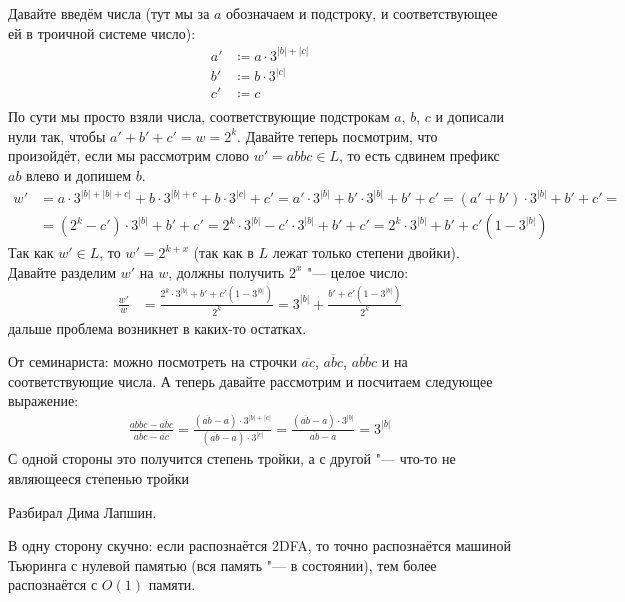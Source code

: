 	Давайте введём числа (тут мы за $a$ обозначаем и подстроку, и соответствующее ей
	в троичной системе число):
	\begin{align*}
		a' &\coloneq a \cdot 3^{|b|+|c|} \\
		b' &\coloneq b \cdot 3^{|c|} \\
		c' &\coloneq c \\
	\end{align*}
	По сути мы просто взяли числа, соответствующие подстрокам $a$, $b$, $c$ и дописали нули так, чтобы
	$a'+b'+c'=w=2^k$.
	Давайте теперь посмотрим, что произойдёт, если мы рассмотрим слово $w'=abbc\in L$,
	то есть сдвинем префикс $ab$ влево и допишем $b$.
	\begin{align*}
		w' &= a\cdot3^{|b|+|b|+c|} + b\cdot3^{|b|+c} + b\cdot3^{|c|} + c' =
		      a'\cdot3^{|b|} + b'\cdot3^{|b|} + b' + c' =
		      (a'+b')\cdot3^{|b|} + b' + c' = \\
		   &= (2^k-c')\cdot3^{|b|} + b' + c' =
		      2^k\cdot3^{|b|}-c'\cdot3^{|b|}+b'+c' =
		      2^k\cdot3^{|b|}+b'+c'(1-3^{|b|})
	\end{align*}
	Так как $w' \in L$, то $w' = 2^{k+x}$ (так как в $L$ лежат только степени двойки).
	Давайте разделим $w'$ на $w$, должны получить $2^x$ "--- целое число:
	\begin{align*}
		\frac{w'}{w}
			&= \frac{2^k\cdot3^{|b|}+b'+c'(1-3^{|b|})}{2^k} =
			3^{|b|}+\frac{b'+c'(1-3^{|b|})}{2^k}
	\end{align*}
	\TODO дальше проблема возникнет в каких-то остатках.

	\begin{Rem}
		От семинариста:
		можно посмотреть на строчки $\overline{ac}$, $\overline{abc}$, $\overline{abbc}$ и на соответствующие числа.
		А теперь давайте рассмотрим и посчитаем следующее выражение:
		\begin{gather*}
			\frac{\overline{abbc}-\overline{abc}}{\overline{abc}-\overline{ac}} =
			\frac{(\overline{ab}-a)\cdot3^{|b|+|c|}}{(\overline{ab}-a)\cdot3^{|c|}} =
			\frac{(\overline{ab}-a)\cdot3^{|b|}}{\overline{ab}-a} =
			3^{|b|}
		\end{gather*}
		С одной стороны это получится степень тройки, а с другой "--- что-то не являющееся степенью тройки
		\TODO
	\end{Rem}

	Разбирал Дима Лапшин.

	В одну сторону скучно: если распознаётся 2DFA, то точно распознаётся машиной Тьюринга с нулевой памятью
	(вся память "--- в состоянии), тем более распознаётся с $O(1)$ памяти.

